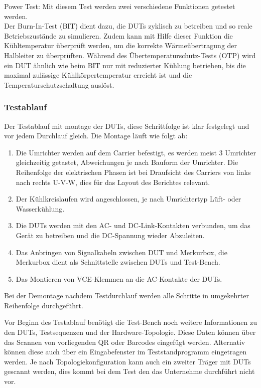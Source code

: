 Power Test:
Mit diesem Test werden zwei verschiedene Funktionen getestet werden.\\
Der Burn-In-Test (BIT) dient dazu, die \ac{DUTs} zyklisch zu betreiben und so reale Betriebszustände zu simulieren.
Zudem kann mit Hilfe dieser Funktion die Kühltemperatur überprüft werden, um die korrekte Wärmeübertragung der Halbleiter zu überprüften.
Während des Übertemperaturschutz-Tests (OTP) wird ein DUT ähnlich wie beim BIT nur mit reduzierter Kühlung betrieben, bis die maximal zulässige
Kühlkörpertemperatur erreicht ist und die Temperaturschutzschaltung auslöst.\cite*{Main_Manuel_USTB2018}

\subsubsection{Testablauf}
Der Testablauf mit montage der \ac{DUTs}, diese Schrittfolge ist klar festgelegt und vor jedem Durchlauf gleich.
Die Montage läuft wie folgt ab:
\begin{enumerate}

\item Die Umrichter werden auf dem Carrier befestigt, es werden meist 3 Umrichter gleichzeitig getastet, Abweichungen je nach Bauform der Umrichter.
Die Reihenfolge der elektrischen Phasen ist bei Draufsicht des Carriers von links nach rechts U-V-W, dies für das Layout des Berichtes relevant.
\item Der Kühlkreislaufen wird angeschlossen, je nach Umrichtertyp Lüft- oder Wasserkühlung.
\item Die \ac{DUTs} werden mit den AC- und DC-Link-Kontakten verbunden, um das Gerät zu betreiben und die DC-Spannung wieder Abzuleiten.
\item Das Anbringen von Signalkabeln zwischen DUT und Merkurbox, die Merkurbox dient als Schnittstelle zwischen \ac{DUTs} und Test-Bench.
\item Das Montieren von VCE-Klemmen an die AC-Kontakte der \ac{DUTs}.

\end{enumerate}

Bei der Demontage nachdem Testdurchlauf werden alle Schritte in umgekehrter Reihenfolge durchgeführt.

Vor Beginn des Testablauf benötigt die Test-Bench noch weitere Informationen zu den \ac{DUTs}, Testsequenzen und der Hardware-Topologie.
Diese Daten können über das Scannen von vorliegenden QR oder Barcodes eingefügt werden.
Alternativ können diese auch über ein Eingabefenster im Teststandprogramm eingetragen werden.
Je nach Topologiekonfiguration kann auch ein zweiter Träger mit DUTs gescannt werden,
dies kommt bei dem Test den das Unternehme durchführt nicht vor.\cite*{Main_Manuel_USTB2018}

